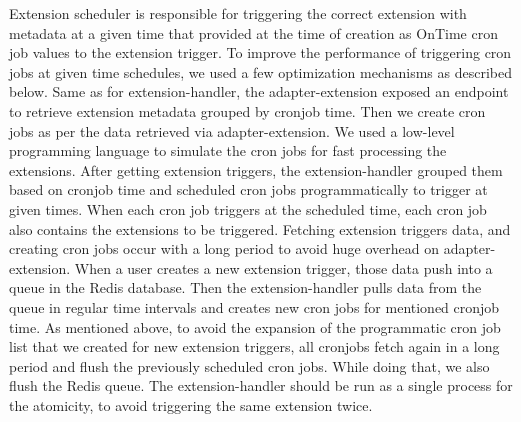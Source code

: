 Extension scheduler is responsible for triggering the correct extension with metadata at a given time that provided at the time of creation as OnTime cron job values to the extension trigger. To improve the performance of triggering cron jobs at given time schedules, we used a few optimization mechanisms as described below. 
Same as for extension-handler, the adapter-extension exposed an endpoint to retrieve extension metadata grouped by cronjob time. Then we create cron jobs as per the data retrieved via adapter-extension. We used a low-level programming language to simulate the cron jobs for fast processing the extensions. After getting extension triggers, the extension-handler grouped them based on cronjob time and scheduled cron jobs programmatically to trigger at given times. 
When each cron job triggers at the scheduled time, each cron job also contains the extensions to be triggered. Fetching extension triggers data, and creating cron jobs occur with a long period to avoid huge overhead on adapter-extension. When a user creates a new extension trigger, those data push into a queue in the Redis database. Then the extension-handler pulls data from the queue in regular time intervals and creates new cron jobs for mentioned cronjob time. 
As mentioned above, to avoid the expansion of the programmatic cron job list that we created for new extension triggers, all cronjobs fetch again in a long period and flush the previously scheduled cron jobs. While doing that, we also flush the Redis queue.
The extension-handler should be run as a single process for the atomicity, to avoid triggering the same extension twice.